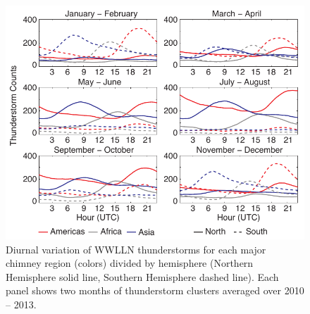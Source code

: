  \begin{figure}[ht!]
    \centering
    \includegraphics[scale=1]{GEC/Figures/bimonthly.pdf} 
    \caption{Diurnal variation of WWLLN thunderstorms for each major chimney region (colors) divided by hemisphere (Northern Hemisphere solid line, Southern Hemisphere dashed line).
    		Each panel shows two months of thunderstorm clusters averaged over 2010 -- 2013.
		 }
    \label{bimonthly}
 \end{figure}

